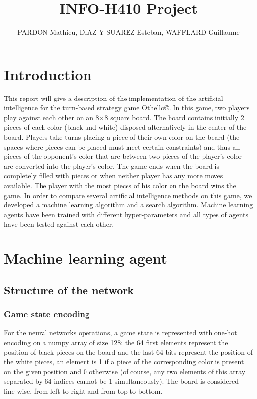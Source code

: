 \documentclass{article}
\title{INFO-H410 Project}
\author{PARDON Mathieu, DIAZ Y SUAREZ Esteban, WAFFLARD Guillaume}
\date{}
\begin{document}
\maketitle
\tableofcontents
\clearpage


\section{Introduction}

This report will give a description of the implementation of the artificial intelligence for the turn-based strategy game Othello\copyright. In this game, two players play against each other on an 8×8 square board. The board contains initially 2 pieces of each color (black and white) disposed alternatively in the center of the board. Players take turns placing a piece of their own color on the board (the spaces where pieces can be placed must meet certain constraints) and thus all pieces of the opponent's color that are between two pieces of the player's color are converted into the player's color. The game ends when the board is completely filled with pieces or when neither player has any more moves available. The player with the most pieces of his color on the board wins the game. In order to compare several artificial intelligence methods on this game, we developed a machine learning algorithm and a search algorithm. Machine learning agents have been trained with different hyper-parameters and all types of agents have been tested against each other.

\section{Machine learning agent}

\subsection{Structure of the network}

\subsubsection{Game state encoding}

For the neural networks operations, a game state is represented with one-hot encoding on a numpy array of size 128: the 64 first elements represent the position of black pieces on the board and the last 64 bits represent the position of the white pieces, an element is 1 if a piece of the corresponding color is present on the given position and 0 otherwise (of course, any two elements of this array separated by 64 indices cannot be 1 simultaneously). The board is considered line-wise, from left to right and from top to bottom.
\end{document}
